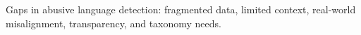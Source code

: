 Gaps in abusive language detection: fragmented data, limited context, real-world misalignment, transparency, and taxonomy needs.